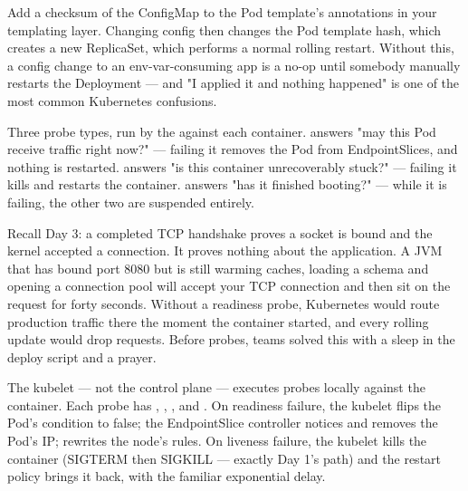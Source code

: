 \begin{autotip}
Add a checksum of the ConfigMap to the Pod template's annotations in your templating layer. Changing config then changes the Pod template hash, which creates a new ReplicaSet, which performs a normal rolling restart. Without this, a config change to an env-var-consuming app is a no-op until somebody manually restarts the Deployment --- and "I applied it and nothing happened" is one of the most common Kubernetes confusions.
\end{autotip}


 Three probe types, run by the  against each container.  answers "may this Pod receive traffic right now?" --- failing it removes the Pod from EndpointSlices, and nothing is restarted.  answers "is this container unrecoverably stuck?" --- failing it kills and restarts the container.  answers "has it finished booting?" --- while it is failing, the other two are suspended entirely.

 Recall Day 3: a completed TCP handshake proves a socket is bound and the kernel accepted a connection. It proves nothing about the application. A JVM that has bound port 8080 but is still warming caches, loading a schema and opening a connection pool will accept your TCP connection and then sit on the request for forty seconds. Without a readiness probe, Kubernetes would route production traffic there the moment the container started, and every rolling update would drop requests. Before probes, teams solved this with a sleep in the deploy script and a prayer.

 The kubelet --- not the control plane --- executes probes locally against the container. Each probe has , , ,  and . On readiness failure, the kubelet flips the Pod's  condition to false; the EndpointSlice controller notices and removes the Pod's IP;  rewrites the node's rules. On liveness failure, the kubelet kills the container (SIGTERM then SIGKILL --- exactly Day 1's path) and the restart policy brings it back, with the familiar exponential  delay.

